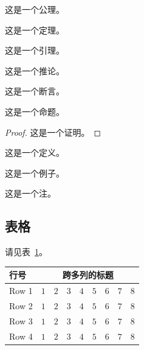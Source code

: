 \begin{axiom}
   这是一个公理。 
\end{axiom}
\begin{theorem}
   这是一个定理。 
\end{theorem}
\begin{lemma}
   这是一个引理。 
\end{lemma}
\begin{corollary}
   这是一个推论。 
\end{corollary}
\begin{assertion}
   这是一个断言。 
\end{assertion}
\begin{proposition}
   这是一个命题。 
\end{proposition}
\begin{proof}
    这是一个证明。
\end{proof}
\begin{definition}
    这是一个定义。
\end{definition}
\begin{example}
    这是一个例子。
\end{example}
\begin{remark}
    这是一个注。
\end{remark}

\subsection{表格}

请见表~\ref{tab:sample}。
\begin{table}[!htbp]
    \label{tab:sample}
    \centering
    \setlength{\tabcolsep}{4pt}%
    \renewcommand{\arraystretch}{1.2}%
    \begin{tabular}{lcccccccc}
        \hline
        行号 & \multicolumn{8}{c}{跨多列的标题}\\
        \hline
        Row 1 & $1$ & $2$ & $3$ & $4$ & $5$ & $6$ & $7$ & $8$\\
        Row 2 & $1$ & $2$ & $3$ & $4$ & $5$ & $6$ & $7$ & $8$\\
        Row 3 & $1$ & $2$ & $3$ & $4$ & $5$ & $6$ & $7$ & $8$\\
        Row 4 & $1$ & $2$ & $3$ & $4$ & $5$ & $6$ & $7$ & $8$\\
        \hline
    \end{tabular}
\end{table}

